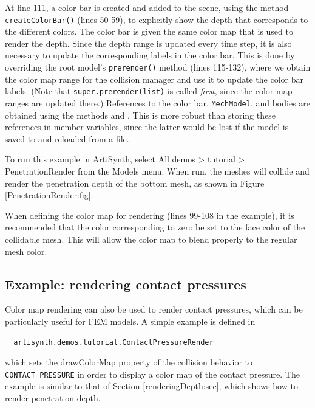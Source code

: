 At line 111, a color bar is created and added to the scene, using the
method {\tt createColorBar()} (lines 50-59), to explicitly show the
depth that corresponds to the different colors. The color bar is given
the same color map that is used to render the depth. Since the depth
range is updated every time step, it is also necessary to update the
corresponding labels in the color bar. This is done by overriding the
root model's {\tt prerender()} method (lines 115-132), where we obtain
the color map range for the collision manager and use it to update the
color bar labels. (Note that {\tt super.prerender(list)} is called {\it
first}, since the color map ranges are updated there.)
References to the color bar, {\tt MechModel}, and
bodies are obtained using the
 methods
 and
.
This is more robust than storing these references in  member
variables, since the latter would be lost if the model is saved to and
reloaded from a file.

To run this example in ArtiSynth, select {\sf All demos > tutorial >
PenetrationRender} from the {\sf Models} menu. When run, the meshes
will collide and render the penetration depth of the bottom mesh, 
as shown in Figure \ref{PenetrationRender:fig}.

\begin{sideblock}
When defining the color map for rendering (lines 99-108 in the
example), it is recommended that the color corresponding to zero be
set to the face color of the collidable mesh.  This will allow
the color map to blend properly to the regular mesh color.
\end{sideblock}

\subsection{Example: rendering contact pressures}
\label{renderingContactPressure:sec}

Color map rendering can also be used to render contact pressures,
which can be particularly useful for FEM models. A simple example is
defined in
%
\begin{verbatim}
  artisynth.demos.tutorial.ContactPressureRender
\end{verbatim}
%
which sets the {\sf drawColorMap} property of the collision behavior to {\tt
CONTACT\_PRESSURE} in order to display a color map of the contact
pressure. The example is similar to that
of Section \ref{renderingDepth:sec}, which shows how to render
penetration depth.

